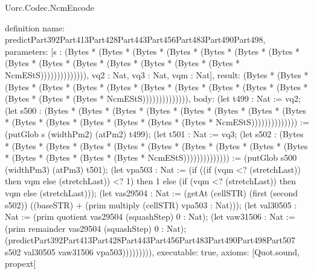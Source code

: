 \begin{lexlean}{Uorc.Codec.NcmEncode}
\begin{semanticmodule}
definition{
  name: predictPart392Part413Part428Part443Part456Part483Part490Part498,
  parameters: [s : (Bytes * (Bytes * (Bytes * (Bytes * (Bytes * (Bytes * (Bytes * (Bytes * (Bytes * (Bytes * (Bytes * (Bytes * (Bytes * (Bytes * NcmEStS)))))))))))))), vq2 : Nat, vq3 : Nat, vqm : Nat],
  result: (Bytes * (Bytes * (Bytes * (Bytes * (Bytes * (Bytes * (Bytes * (Bytes * (Bytes * (Bytes * (Bytes * (Bytes * (Bytes * (Bytes * NcmEStS)))))))))))))),
  body: (let t499 : Nat := vq2; (let s500 : (Bytes * (Bytes * (Bytes * (Bytes * (Bytes * (Bytes * (Bytes * (Bytes * (Bytes * (Bytes * (Bytes * (Bytes * (Bytes * (Bytes * NcmEStS)))))))))))))) := (putGlob s (widthPm2) (atPm2) t499); (let t501 : Nat := vq3; (let s502 : (Bytes * (Bytes * (Bytes * (Bytes * (Bytes * (Bytes * (Bytes * (Bytes * (Bytes * (Bytes * (Bytes * (Bytes * (Bytes * (Bytes * NcmEStS)))))))))))))) := (putGlob s500 (widthPm3) (atPm3) t501); (let vpa503 : Nat := (if ((if (vqm <? (stretchLast)) then vqm else (stretchLast)) <? 1) then 1 else (if (vqm <? (stretchLast)) then vqm else (stretchLast))); (let vas29504 : Nat := (getAt (cellSTR) (first (second s502)) ((baseSTR) + (prim multiply (cellSTR) vpa503 : Nat))); (let val30505 : Nat := (prim quotient vas29504 (squashStep) 0 : Nat); (let vaw31506 : Nat := (prim remainder vas29504 (squashStep) 0 : Nat); (predictPart392Part413Part428Part443Part456Part483Part490Part498Part507 s502 val30505 vaw31506 vpa503))))))))),
  executable: true,
  axioms: [Quot.sound, propext]
}


\end{semanticmodule}
\end{lexlean}
